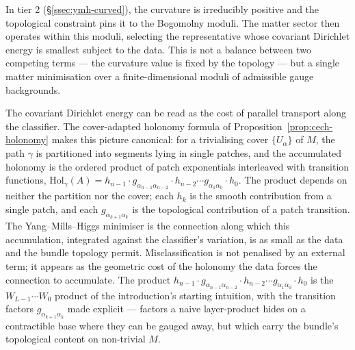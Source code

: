 In tier 2 (\S\ref{ssec:ymh-curved}), the curvature is irreducibly
positive and the topological constraint pins it to the Bogomolny
moduli. The matter sector then operates within this moduli,
selecting the representative whose covariant Dirichlet energy is
smallest subject to the data. This is not a balance between two
competing terms --- the curvature value is fixed by the topology ---
but a single matter minimisation over a finite-dimensional moduli of
admissible gauge backgrounds.

\begin{remark}\label{rem:holonomy-accumulation}
The covariant Dirichlet energy can be read as the cost of parallel
transport along the classifier. The cover-adapted holonomy formula
of Proposition~\ref{prop:cech-holonomy} makes this picture
canonical: for a trivialising cover $\{U_\alpha\}$ of $M$, the path
$\gamma$ is partitioned into segments lying in single patches, and
the accumulated holonomy is the ordered product of patch
exponentials interleaved with transition functions,
$\mathrm{Hol}_\gamma(A)=h_{n-1}\cdot g_{\alpha_{n-1}\alpha_{n-2}}
\cdot h_{n-2}\cdots g_{\alpha_1\alpha_0}\cdot h_0$. The product
depends on neither the partition nor the cover; each $h_k$ is the
smooth contribution from a single patch, and each
$g_{\alpha_{k+1}\alpha_k}$ is the topological contribution of a patch
transition. The Yang--Mills--Higgs minimiser is the connection along
which this accumulation, integrated against the classifier's
variation, is as small as the data and the bundle topology permit.
Misclassification is not penalised by an external term; it appears as
the geometric cost of the holonomy the data forces the connection to
accumulate. The product
$h_{n-1}\cdot g_{\alpha_{n-1}\alpha_{n-2}}\cdot h_{n-2}\cdots
g_{\alpha_1\alpha_0}\cdot h_0$ is the $W_{L-1}\cdots W_0$ product of
the introduction's starting intuition, with the transition factors
$g_{\alpha_{k+1}\alpha_k}$ made explicit --- factors a naive
layer-product hides on a contractible base where they can be
gauged away, but which carry the bundle's topological content on
non-trivial $M$.
\end{remark}

